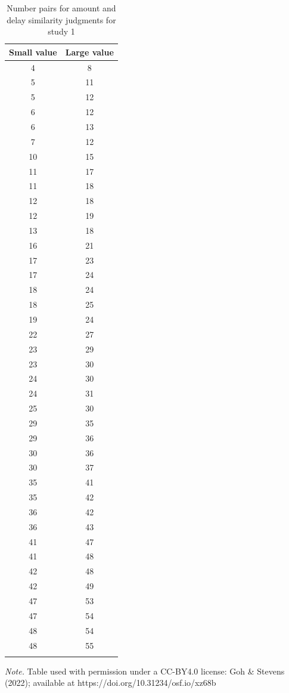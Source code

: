 \documentclass[
  doc,floatsintext]{apa6}
\begin{document}
\clearpage

\begin{table}[tbp]

\begin{center}
\begin{threeparttable}

\caption{\label{tab:unnamed-chunk-2}Number pairs for amount and delay similarity judgments for study 1}

\small{

\begin{tabular}{cc}
\toprule
Small value & \multicolumn{1}{c}{Large value}\\
\midrule
4 & 8\\
5 & 11\\
5 & 12\\
6 & 12\\
6 & 13\\
7 & 12\\
10 & 15\\
11 & 17\\
11 & 18\\
12 & 18\\
12 & 19\\
13 & 18\\
16 & 21\\
17 & 23\\
17 & 24\\
18 & 24\\
18 & 25\\
19 & 24\\
22 & 27\\
23 & 29\\
23 & 30\\
24 & 30\\
24 & 31\\
25 & 30\\
29 & 35\\
29 & 36\\
30 & 36\\
30 & 37\\
35 & 41\\
35 & 42\\
36 & 42\\
36 & 43\\
41 & 47\\
41 & 48\\
42 & 48\\
42 & 49\\
47 & 53\\
47 & 54\\
48 & 54\\
48 & 55\\
\bottomrule
\addlinespace
\end{tabular}

}

\begin{tablenotes}[para]
\normalsize{\textit{Note.} Table used with permission under a CC-BY4.0 license: Goh \& Stevens (2022); available at https://doi.org/10.31234/osf.io/xz68b}
\end{tablenotes}

\end{threeparttable}
\end{center}

\end{table}
\end{document}
